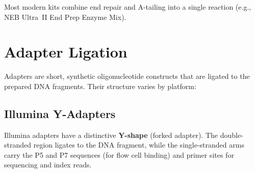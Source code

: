 Most modern kits combine end repair and A-tailing into a single reaction (e.g., NEB Ultra~II End Prep Enzyme Mix).


\section{Adapter Ligation}
\label{sec:adapters}

Adapters are short, synthetic oligonucleotide constructs that are ligated to the prepared DNA fragments. Their structure varies by platform:

\subsection{Illumina Y-Adapters}

Illumina adapters have a distinctive \textbf{Y-shape} (forked adapter). The double-stranded region ligates to the DNA fragment, while the single-stranded arms carry the P5 and P7 sequences (for flow cell binding) and primer sites for sequencing and index reads.

